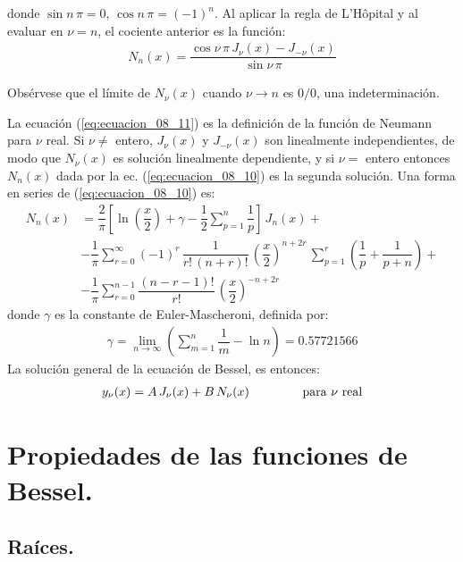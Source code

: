 donde $\sin n \, \pi = 0$, $\cos n \, \pi = (-1)^{n}$. Al aplicar la regla de L'Hôpital y al evaluar en $\nu = n$, el cociente anterior es la función:
\begin{align}
N_{n} (x) = \dfrac{\cos \nu \, \pi \, J_{\nu} (x) - J_{-\nu} (x)}{\sin \nu \, \pi}
\label{eq:ecuacion_08_11}
\end{align}

Obsérvese que el límite de $N_{\nu} (x)$ cuando $\nu \to n$ es $0/0$, una indeterminación.
\par
La ecuación (\ref{eq:ecuacion_08_11}) es la definición de la función de Neumann para $\nu$ real. Si $\nu \neq$ entero, $J_{\nu} (x)$ y $J_{-\nu} (x)$ son linealmente independientes, de modo que $N_{\nu}(x)$ es solución linealmente dependiente, y si $\nu =$ entero entonces $N_{n}(x)$ dada por la ec. (\ref{eq:ecuacion_08_10}) es la segunda solución. Una forma en series de (\ref{eq:ecuacion_08_10}) es:
\begin{align*}
N_{n}(x) &= \dfrac{2}{\pi} \left[ \ln \left(\dfrac{x}{2} \right) + \gamma - \dfrac{1}{2} \sum_{p=1}^{n} \dfrac{1}{p} \right] \, J_{n} (x) + \\[0.5em]
&- \dfrac{1}{\pi} \sum_{r=0}^{\infty} (-1)^{r} \, \dfrac{1}{r! \, (n + r)!} \, \left( \dfrac{x}{2} \right)^{n+2r} \, \sum_{p=1}^{r} \left( \dfrac{1}{p} + \dfrac{1}{p + n} \right) + \\[0.5em]
&- \dfrac{1}{\pi} \sum_{r=0}^{n-1} \dfrac{(n - r - 1)!}{r!} \, \left( \dfrac{x}{2} \right)^{-n+2r}
\end{align*}
donde $\gamma$ es la constante de Euler-Mascheroni, definida por:
\begin{align*}
\gamma = \lim_{n \to \infty} \left( \sum_{m=1}^{n} \dfrac{1}{m} - \ln n \right) = 0.57721566
\end{align*}
La solución general de la ecuación de Bessel, es entonces:
\begin{align*}
y_{\nu} (x) = A \, J_{\nu} (x) + B \, N_{\nu} (x) \hspace{1.5cm} \mbox{para $\nu$ real}
\end{align*}

\section{Propiedades de las funciones de Bessel.}
\subsection{Raíces.}

